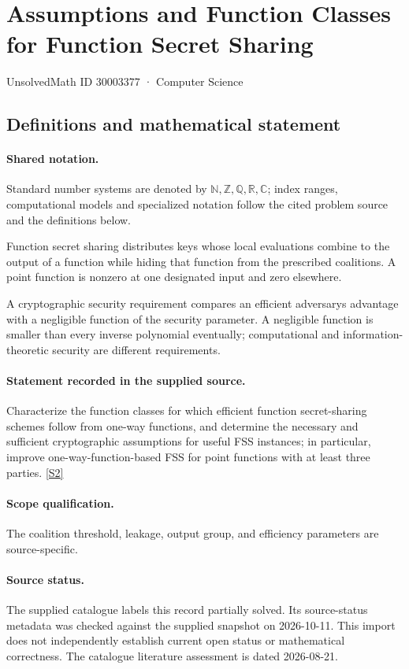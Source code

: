 \documentclass[11pt]{article}
\newcommand{\sref}[2]{\hyperlink{source:#1:#2}{[S#2]}}
\begin{document}
\setcounter{section}{30003376}
\section{Assumptions and Function Classes for Function Secret Sharing}\label{30003377}
{\small\sffamily UnsolvedMath ID 30003377 · Computer Science}
\subsection{Definitions and mathematical statement}

\paragraph{Shared notation.}Standard number systems are denoted by $\mathbb N,\mathbb Z,\mathbb Q,\mathbb R,\mathbb C$; index ranges, computational models and specialized notation follow the cited problem source and the definitions below.


Function secret sharing distributes keys whose local evaluations combine to the output of a function while hiding that function from the prescribed coalitions. A point function is nonzero at one designated input and zero elsewhere.

A cryptographic security requirement compares an efficient adversary\textquotesingle s advantage with a negligible function of the security parameter. A negligible function is smaller than every inverse polynomial eventually; computational and information-theoretic security are different requirements.
\paragraph{Statement recorded in the supplied source.}
Characterize the function classes for which efficient function secret-sharing schemes follow from one-way functions, and determine the necessary and sufficient cryptographic assumptions for useful FSS instances; in particular, improve one-way-function-based FSS for point functions with at least three parties. \sref{30003377}{2}
\paragraph{Scope qualification.}
The coalition threshold, leakage, output group, and efficiency parameters are source-specific.
\paragraph{Source status.}
The supplied catalogue labels this record partially solved. Its source-status metadata was checked against the supplied snapshot on 2026-10-11. This import does not independently establish current open status or mathematical correctness. The catalogue literature assessment is dated 2026-08-21.
\end{document}
